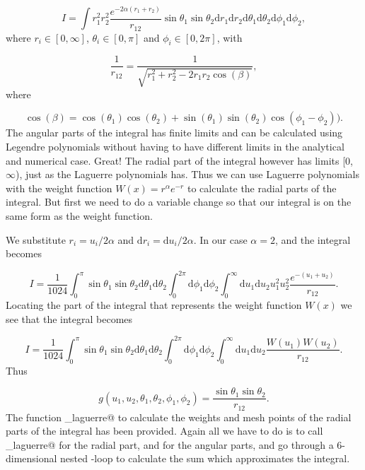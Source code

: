 \documentclass{article}
\begin{document}
\begin{multicols}{2}
\begin{equation}\label{eg:gaulag}
	I = \int    r_1^2 r_2^2 \frac{e^{- 2 \alpha (r_1 + r_2)}}{r_{12}} \sin \theta_1 \sin \theta_2 \mathrm{d}r_1  \mathrm{d}r_2 \mathrm{d}\theta_1 \mathrm{d}\theta_2 \mathrm{d}\phi_1\mathrm{d}\phi_2,
\end{equation}
where $r_i \in [0,\infty]$, $\theta_i \in [0,\pi]$ and $\phi_i \in [0, 2\pi]$, with

\begin{equation*}
	\frac{1}{r_{12}}= \frac{1}{\sqrt{r_1^2+r_2^2-2r_1r_2\cos(\beta)}},
\end{equation*}
where

\begin{equation*}
	\cos(\beta) = \cos(\theta_1)\cos(\theta_2)+\sin(\theta_1)\sin(\theta_2)\cos(\phi_1-\phi_2)).
\end{equation*}
The angular parts of the integral has finite limits and can be calculated using Legendre polynomials without having to have different limits in the analytical and numerical case. Great! The radial part of the integral however has limits [0,$\infty$), just as the Laguerre polynomials has. Thus we can use Laguerre polynomials with the weight function $W(x) = r^{\alpha} e^{-r}$ to calculate the radial parts of the integral. But first we need to do a variable change so that our integral is on the same form as the weight function. 

We substitute $r_i = u_i/2\alpha$ and $\mathrm{d}r_i = \mathrm{d}u_i/2\alpha$. In our case $\alpha = 2$, and the integral becomes

\begin{equation*}
	I = \frac{1}{1024} \int_0^{\pi} \sin \theta_1 \sin \theta_2 \mathrm{d}\theta_1 \mathrm{d}\theta_2 
	\int_0^{2\pi} \mathrm{d}\phi_1\mathrm{d}\phi_2
	\int_0^{\infty}   \mathrm{d}u_1  \mathrm{d}u_2 u_1^2 u_2^2 \frac{e^{- (u_1 + u_2)}}{r_{12}}.
\end{equation*}
Locating the part of the integral that represents the weight function $W(x)$ we see that the integral becomes

\begin{equation*}
	I = \frac{1}{1024} \int_0^{\pi} \sin \theta_1 \sin \theta_2 \mathrm{d}\theta_1 \mathrm{d}\theta_2 
	\int_0^{2\pi} \mathrm{d}\phi_1\mathrm{d}\phi_2
	\int_0^{\infty}   \mathrm{d}u_1  \mathrm{d}u_2 \frac{W(u_1) W(u_2)}{r_{12}}.
\end{equation*}
Thus 

\begin{equation}
	g(u_1, u_2, \theta_1, \theta_2, \phi_1, \phi_2) = \frac{\sin \theta_1 \sin \theta_2}{r_{12}}.
\end{equation}
The function \verb@gauss_laguerre@ to calculate the weights and mesh points of the radial parts of the integral has been provided. Again all we have to do is to call \verb@gauss_laguerre@ for the radial part, and \verb@gauleg@ for the angular parts, and go through a 6-dimensional nested \verb@for@-loop to calculate the sum which approximates the integral. 






\end{multicols}
\end{document}
